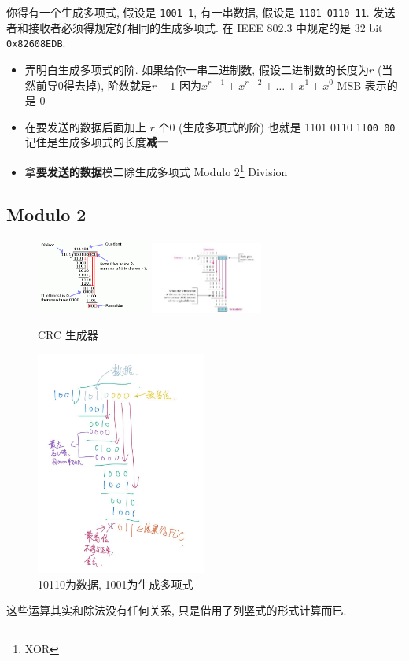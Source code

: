 \documentclass[a4paper]{report}
\begin{document}
你得有一个生成多项式, 假设是 \texttt{1001 1}, 有一串数据, 假设是 \texttt{1101 0110 11}. 发送者和接收者必须得规定好相同的生成多项式. 在 IEEE 802.3 中规定的是 32 bit \texttt{0x82608EDB}. 
\begin{itemize}
  \item 弄明白生成多项式的阶. 
  \subitem 如果给你一串二进制数, 假设二进制数的长度为$r$ (当然前导0得去掉), 阶数就是$r-1$
  \subitem 因为$x^{r-1}+x^{r-2}+\dots+x^{1}+x^0$ MSB 表示的是 0 
  \item 在要发送的数据后面加上 $r$ 个0 (生成多项式的阶)
  \subitem 也就是 1101 0110 11\texttt{00 00} 记住是生成多项式的长度\textbf{减一}
  \item 拿\textbf{要发送的数据}模二除生成多项式
  \subitem Modulo 2\footnote{XOR} Division
\end{itemize}
\subsection{Modulo 2}
\begin{figure}[H]
\centering
\includegraphics[width=0.33\textwidth]{crc_gen.png}
\includegraphics[width=0.33\textwidth]{crc_gen_3.png}
\caption{CRC 生成器}
\end{figure}

\begin{figure}[htbp]
\centering
\includegraphics[width=0.5\textwidth]{crc_exp.jpg}
\caption{10110为数据, 1001为生成多项式}
\end{figure}
这些运算其实和除法没有任何关系, 只是借用了列竖式的形式计算而已. 
\end{document}
